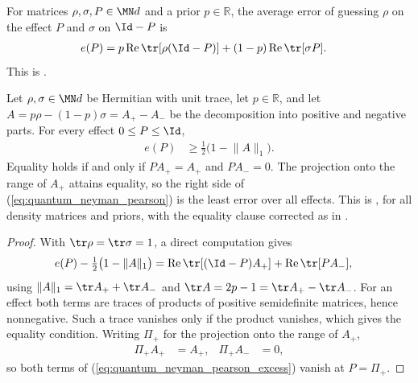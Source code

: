 \begin{definition}
    \label{def:hypothesis_test_error}
    \leanok
    For matrices $\rho,\sigma,P\in\MN d$ and a prior $p\in\mathbb R$, the
    average error of guessing $\rho$ on the effect $P$ and $\sigma$ on
    $\Id-P$ is
    \begin{align}
        e(P)&=p\operatorname{Re}\tr[\rho(\Id-P)]
            +(1-p)\operatorname{Re}\tr[\sigma P].
        \label{eq:hypothesis_test_error}
    \end{align}
    This is \cite[Equation~(8.40)]{Wolf2012Quantum}.
\end{definition}

\begin{theorem}
    \label{thm:quantum_neyman_pearson}
    \leanok
    Let $\rho,\sigma\in\MN d$ be Hermitian with unit trace, let $p\in\mathbb R$,
    and let $A=p\rho-(1-p)\sigma=A_+-A_-$ be the decomposition into positive
    and negative parts. For every effect $0\le P\le\Id$,
    \begin{align}
        e(P)&\ge\tfrac12\bigl(1-\lVert A\rVert_1\bigr).
        \label{eq:quantum_neyman_pearson}
    \end{align}
    Equality holds if and only if $PA_+=A_+$ and $PA_-=0$. The projection onto
    the range of $A_+$ attains equality, so the right side of
    (\ref{eq:quantum_neyman_pearson}) is the least error over all effects.
    This is \cite[Equation~(8.41)]{Wolf2012Quantum}, for all density matrices
    and priors, with the equality clause corrected as in
    .
\end{theorem}
\begin{proof}
    \leanok
    With $\tr\rho=\tr\sigma=1$, a direct computation gives
    \begin{align}
        e(P)-\tfrac12\bigl(1-\lVert A\rVert_1\bigr)
            &=\operatorname{Re}\tr[(\Id-P)A_+]+\operatorname{Re}\tr[PA_-],
        \label{eq:quantum_neyman_pearson_excess}
    \end{align}
    using $\lVert A\rVert_1=\tr A_++\tr A_-$ and $\tr A=2p-1=\tr A_+-\tr A_-$.
    For an effect both terms are traces of products of positive semidefinite
    matrices, hence nonnegative. Such a trace vanishes only if the product
    vanishes, which gives the equality condition. Writing $\Pi_+$ for the
    projection onto the range of $A_+$,
    \begin{align}
        \Pi_+A_+&=A_+, & \Pi_+A_-&=0,
        \label{eq:quantum_neyman_pearson_attainment}
    \end{align}
    so both terms of (\ref{eq:quantum_neyman_pearson_excess}) vanish at
    $P=\Pi_+$.
\end{proof}

